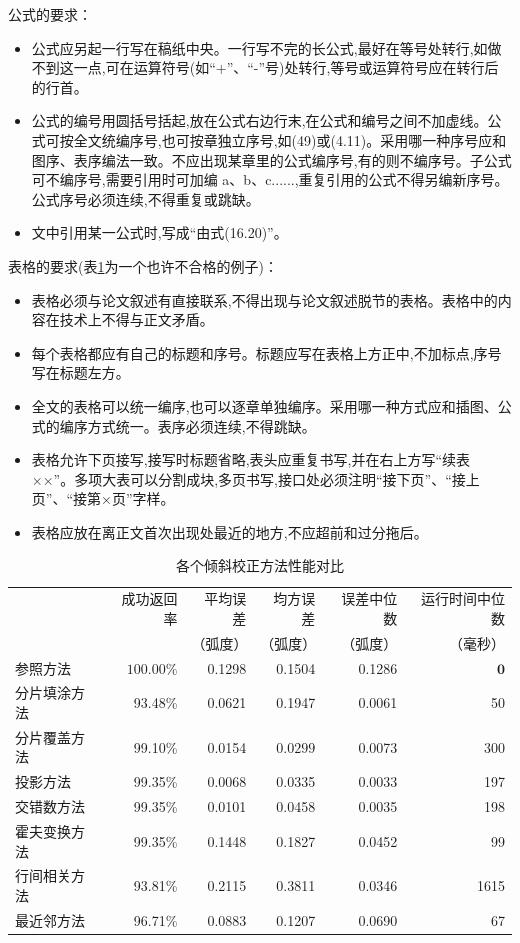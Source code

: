 ﻿\documentclass{sysuthesis}
\begin{document}
公式的要求：

\begin{itemize}
	\item 公式应另起一行写在稿纸中央。一行写不完的长公式,最好在等号处转行,如做不到这一点,可在运算符号(如“+”、“-”号)处转行,等号或运算符号应在转行后的行首。
	\item 公式的编号用圆括号括起,放在公式右边行末,在公式和编号之间不加虚线。公式可按全文统编序号,也可按章独立序号,如(49)或(4.11)。采用哪一种序号应和图序、表序编法一致。不应出现某章里的公式编序号,有的则不编序号。子公式可不编序号,需要引用时可加编 a、b、c......,重复引用的公式不得另编新序号。公式序号必须连续,不得重复或跳缺。
	\item 文中引用某一公式时,写成“由式(16.20)”。
\end{itemize}

表格的要求(表\ref{tab:skew}为一个也许不合格的例子)：

\begin{itemize}
	\item 表格必须与论文叙述有直接联系,不得出现与论文叙述脱节的表格。表格中的内容在技术上不得与正文矛盾。
	\item 每个表格都应有自己的标题和序号。标题应写在表格上方正中,不加标点,序号写在标题左方。
	\item 全文的表格可以统一编序,也可以逐章单独编序。采用哪一种方式应和插图、公式的编序方式统一。表序必须连续,不得跳缺。
	\item 表格允许下页接写,接写时标题省略,表头应重复书写,并在右上方写“续表××”。多项大表可以分割成块,多页书写,接口处必须注明“接下页”、“接上页”、“接第×页”字样。
	\item 表格应放在离正文首次出现处最近的地方,不应超前和过分拖后。
\end{itemize}

\begin{table}[hbp]
	\caption{各个倾斜校正方法性能对比}
	\centering
	\begin{tabular}{lrrrrr}
		\hline
		& 成功返回率 & 平均误差& 均方误差& 误差中位数& 运行时间中位数\\
  & & （弧度） & （弧度） & （弧度） & （毫秒）\\\hline
		参照方法&$\mathbf{100.00\%}$&0.1298&0.1504&0.1286&$\mathbf{0}$\\
		分片填涂方法&93.48\%&0.0621&0.1947&0.0061&50\\
		分片覆盖方法&99.10\%&0.0154&$\mathbf{0.0299}$&0.0073&300\\
		投影方法&99.35\%&$\mathbf{0.0068}$&0.0335&$\mathbf{0.0033}$&197\\
		交错数方法&99.35\%&0.0101&0.0458&0.0035&198\\
		霍夫变换方法&99.35\%&0.1448&0.1827&0.0452&99\\
		行间相关方法&93.81\%&0.2115&0.3811&0.0346&1615\\
		最近邻方法&96.71\%&0.0883&0.1207&0.0690&67\\\hline
	\end{tabular}
	\label{tab:skew}
\end{table}
\end{document}
